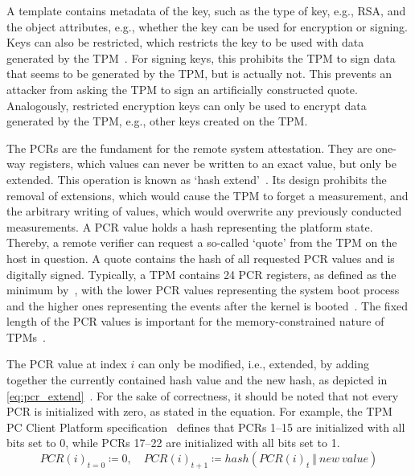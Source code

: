 A template contains metadata of the key, such as the type of key, e.g., RSA, and the object attributes, e.g., whether the key can be used for encryption or signing.
Keys can also be restricted, which restricts the key to be used with data generated by the TPM~\cite{tpm}.
For signing keys, this prohibits the TPM to sign data that seems to be generated by the TPM, but is actually not.
This prevents an attacker from asking the TPM to sign an artificially constructed quote.
Analogously, restricted encryption keys can only be used to encrypt data generated by the TPM, e.g., other keys created on the TPM\@.


The \acp{PCR} are the fundament for the remote system attestation. They are one-way registers, which values can never be written to an exact value, but only be extended.
This operation is known as `hash extend'~\cite{Arthur2015}.
Its design prohibits the removal of extensions, which would cause the TPM to forget a measurement, and the arbitrary writing of values, which would overwrite any previously conducted measurements.
A PCR value holds a hash representing the platform state.
Thereby, a remote verifier can request a so-called `quote' from the TPM on the host in question.
A quote contains the hash of all requested PCR values and is digitally signed.
Typically, a TPM contains 24 PCR registers, as defined as the minimum by~\cite{tcgPcClient}, with the lower PCR values representing the system boot process and the higher ones representing the events after the kernel is booted~\cite{Arthur2015}.
The fixed length of the \ac{PCR} values is important for the memory-constrained nature of TPMs~\cite{Arthur2015}.

The PCR value at index \(i\) can only be modified, i.e., extended, by adding together the currently contained hash value and the new hash, as depicted in \autoref{eq:pcr_extend}~\cite{tpm}.
For the sake of correctness, it should be noted that not every PCR is initialized with zero, as stated in the equation.
For example, the TPM PC Client Platform specification~\cite{tcgPcClient} defines that PCRs 1--15 are initialized with all bits set to 0, while PCRs 17--22 are initialized with all bits set to 1.
\begin{equation}
  \label{eq:pcr_extend}
PCR(i)_{t=0} \coloneqq 0,\quad PCR(i)_{t+1} \coloneqq hash(PCR(i)_t\ \Vert\ new\ value)
\end{equation}

